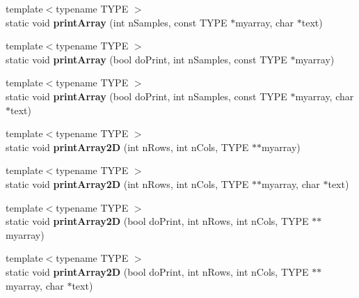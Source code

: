 \begin{DoxyCompactItemize}
\item 
{\footnotesize template$<$typename T\+Y\+PE $>$ }\\static void {\bfseries print\+Array} (int n\+Samples, const T\+Y\+PE $\ast$myarray, char $\ast$text)\hypertarget{class_k_w_util_aa537bb86732154b9ad1317e851afccfd}{}\label{class_k_w_util_aa537bb86732154b9ad1317e851afccfd}

\item 
{\footnotesize template$<$typename T\+Y\+PE $>$ }\\static void {\bfseries print\+Array} (bool do\+Print, int n\+Samples, const T\+Y\+PE $\ast$myarray)\hypertarget{class_k_w_util_a551666cf04781258441f4d5a77c6a7d8}{}\label{class_k_w_util_a551666cf04781258441f4d5a77c6a7d8}

\item 
{\footnotesize template$<$typename T\+Y\+PE $>$ }\\static void {\bfseries print\+Array} (bool do\+Print, int n\+Samples, const T\+Y\+PE $\ast$myarray, char $\ast$text)\hypertarget{class_k_w_util_a5eafacfaa0ea74867d2b37cf22558644}{}\label{class_k_w_util_a5eafacfaa0ea74867d2b37cf22558644}

\item 
{\footnotesize template$<$typename T\+Y\+PE $>$ }\\static void {\bfseries print\+Array2D} (int n\+Rows, int n\+Cols, T\+Y\+PE $\ast$$\ast$myarray)\hypertarget{class_k_w_util_a0d00bcaaee4bf9fe1ea3f28c39db766d}{}\label{class_k_w_util_a0d00bcaaee4bf9fe1ea3f28c39db766d}

\item 
{\footnotesize template$<$typename T\+Y\+PE $>$ }\\static void {\bfseries print\+Array2D} (int n\+Rows, int n\+Cols, T\+Y\+PE $\ast$$\ast$myarray, char $\ast$text)\hypertarget{class_k_w_util_a8ca8f9d0826b637aee5285af196431a0}{}\label{class_k_w_util_a8ca8f9d0826b637aee5285af196431a0}

\item 
{\footnotesize template$<$typename T\+Y\+PE $>$ }\\static void {\bfseries print\+Array2D} (bool do\+Print, int n\+Rows, int n\+Cols, T\+Y\+PE $\ast$$\ast$myarray)\hypertarget{class_k_w_util_a2907060d81976090c40829107159666d}{}\label{class_k_w_util_a2907060d81976090c40829107159666d}

\item 
{\footnotesize template$<$typename T\+Y\+PE $>$ }\\static void {\bfseries print\+Array2D} (bool do\+Print, int n\+Rows, int n\+Cols, T\+Y\+PE $\ast$$\ast$myarray, char $\ast$text)\hypertarget{class_k_w_util_a59aabe5a32605da8367ca84c3ad3a0ab}{}\label{class_k_w_util_a59aabe5a32605da8367ca84c3ad3a0ab}


\end{DoxyCompactItemize}
